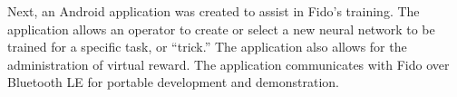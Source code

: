 Next, an Android application was created to assist in Fido's training.  The application allows an operator to create or select a new neural network to be trained for a specific task, or ``trick.''  The application also allows for the administration of virtual reward.  The application communicates with Fido over Bluetooth LE for portable development and demonstration.  